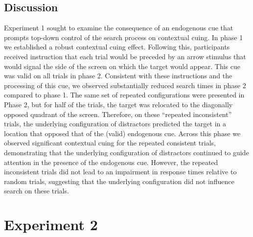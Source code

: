 \documentclass[
  man,floatsintext]{apa7}
\begin{document}
\hypertarget{discussion}{%
\subsection{Discussion}\label{discussion}}

Experiment 1 sought to examine the consequence of an endogenous cue that prompts top-down control of the search process on contextual cuing. In phase 1 we established a robust contextual cuing effect. Following this, participants received instruction that each trial would be preceded by an arrow stimulus that would signal the side of the screen on which the target would appear. This cue was valid on all trials in phase 2. Consistent with these instructions and the processing of this cue, we observed substantially reduced search times in phase 2 compared to phase 1. The same set of repeated configurations were presented in Phase 2, but for half of the trials, the target was relocated to the diagonally opposed quadrant of the screen. Therefore, on these ``repeated inconsistent'' trials, the underlying configuration of distractors predicted the target in a location that opposed that of the (valid) endogenous cue. Across this phase we observed significant contextual cuing for the repeated consistent trials, demonstrating that the underlying configuration of distractors continued to guide attention in the presence of the endogenous cue. However, the repeated inconsistent trials did not lead to an impairment in response times relative to random trials, suggesting that the underlying configuration did not influence search on these trials.

\hypertarget{experiment-2}{%
\section{Experiment 2}\label{experiment-2}}
\end{document}
